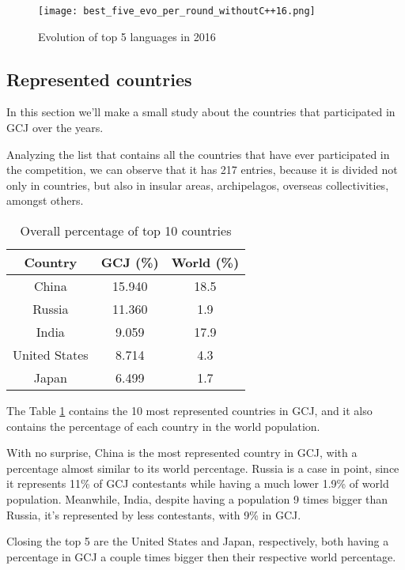 \documentclass{article}
\begin{document}
\begin{multicols*}{2}
\begin{figure}[H]
    \centering
    \texttt{[image: best\_five\_evo\_per\_round\_withoutC++16.png]}
    \caption{Evolution of top 5 languages in 2016}
    \label{fig:best5_evo_round_16}
\end{figure}


\subsection{Represented countries}

In this section we'll make a small study about the countries that participated in GCJ over the years.

Analyzing the list that contains all the countries that have ever participated in the competition, we can observe that it has 217 entries, because it is divided not only in countries, but also in insular areas, archipelagos, overseas collectivities, amongst others.


\begin{table}[H]
\centering
\caption{Overall percentage of top 10 countries}
\label{top10_cont}
\begin{tabular}{c|c|c}
\textbf{Country} & \textbf{GCJ (\%)} & \textbf{World (\%)} \\ \hline
China            & 15.940   & 18.5              \\
Russia           & 11.360   & 1.9               \\
India            & 9.059   & 17.9              \\
United States    & 8.714   & 4.3               \\
Japan            & 6.499   & 1.7               \\
\end{tabular}
\end{table}

The Table \ref{top10_cont} contains the 10 most represented countries in GCJ, and it also contains the percentage of each country in the world population\cite{world_perc}.

With no surprise, China is the most represented country in GCJ, with a percentage almost similar to its world percentage.
Russia is a case in point, since it represents 11\% of GCJ contestants while having a much lower 1.9\% of world population. Meanwhile, India, despite having a population 9 times bigger than Russia, it's represented by less contestants, with 9\% in GCJ.

Closing the top 5 are the United States and Japan, respectively, both having a percentage in GCJ a couple times bigger then their respective world percentage.



\end{multicols*}
\end{document}
